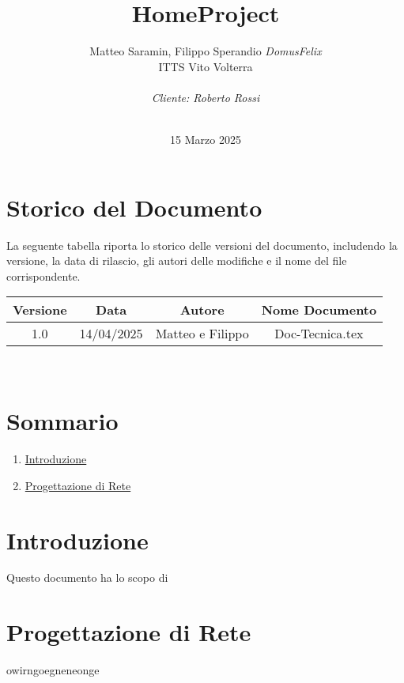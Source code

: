 \documentclass[italian, 12pt, a4paper]{article}
\title{\huge{HomeProject}}
\author{Matteo Saramin, Filippo Sperandio \textit{DomusFelix} \\ {\small ITTS Vito Volterra} \\ \\ \emph{Cliente: Roberto Rossi}}
\date{\version\\ 15 Marzo 2025}
\begin{document}
\maketitle
\section{Storico del Documento}
La seguente tabella riporta lo storico delle versioni del documento, includendo la versione, la data di rilascio, gli autori delle modifiche e il nome del file corrispondente.

\begin{center}
    \renewcommand{\arraystretch}{1.5} %
    \begin{tabular}{|c|c|c|c|}
        \hline
        \rowcolor{violet!30}
        Versione & Data & Autore & Nome Documento \\
        \hline
        1.0 & 14/04/2025 & Matteo e Filippo & Doc-Tecnica.tex \\
        \hline
    \end{tabular}\\[4mm]
\end{center}
\clearpage
\section{Sommario}
\begin{enumerate}
    \item \hyperref[sec:introduzione]{\Large Introduzione}
    \item \hyperref[sec:progettazione]{\Large Progettazione di Rete}
\end{enumerate}
\clearpage
\section{Introduzione}\label{sec:introduzione}
Questo documento ha lo scopo di 
\clearpage
\section{Progettazione di Rete}\label{sec:progettazione}
owirngoegneneonge
\clearpage
\end{document}
